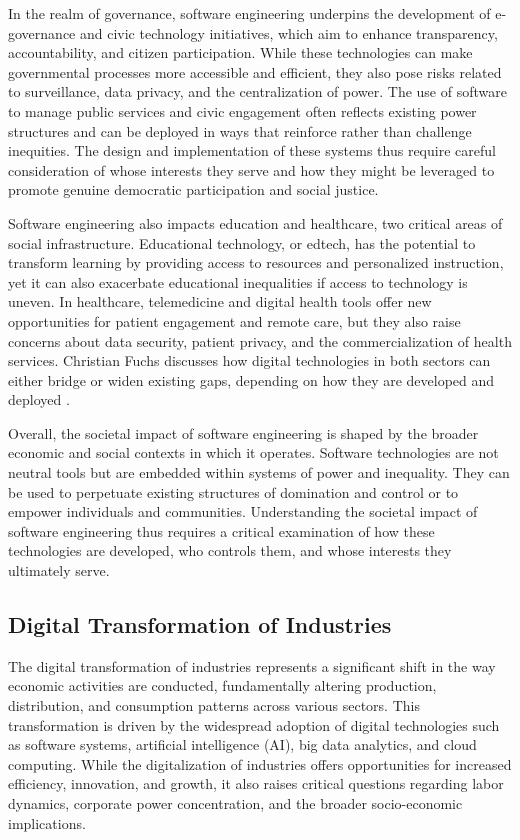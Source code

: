 \begin{refsection}
In the realm of governance, software engineering underpins the development of e-governance and civic technology initiatives, which aim to enhance transparency, accountability, and citizen participation. While these technologies can make governmental processes more accessible and efficient, they also pose risks related to surveillance, data privacy, and the centralization of power. The use of software to manage public services and civic engagement often reflects existing power structures and can be deployed in ways that reinforce rather than challenge inequities. The design and implementation of these systems thus require careful consideration of whose interests they serve and how they might be leveraged to promote genuine democratic participation and social justice.

Software engineering also impacts education and healthcare, two critical areas of social infrastructure. Educational technology, or edtech, has the potential to transform learning by providing access to resources and personalized instruction, yet it can also exacerbate educational inequalities if access to technology is uneven. In healthcare, telemedicine and digital health tools offer new opportunities for patient engagement and remote care, but they also raise concerns about data security, patient privacy, and the commercialization of health services. Christian Fuchs discusses how digital technologies in both sectors can either bridge or widen existing gaps, depending on how they are developed and deployed \cite[pp.~102-105]{fuchs2014digital}.

Overall, the societal impact of software engineering is shaped by the broader economic and social contexts in which it operates. Software technologies are not neutral tools but are embedded within systems of power and inequality. They can be used to perpetuate existing structures of domination and control or to empower individuals and communities. Understanding the societal impact of software engineering thus requires a critical examination of how these technologies are developed, who controls them, and whose interests they ultimately serve.

\subsection{Digital Transformation of Industries}

The digital transformation of industries represents a significant shift in the way economic activities are conducted, fundamentally altering production, distribution, and consumption patterns across various sectors. This transformation is driven by the widespread adoption of digital technologies such as software systems, artificial intelligence (AI), big data analytics, and cloud computing. While the digitalization of industries offers opportunities for increased efficiency, innovation, and growth, it also raises critical questions regarding labor dynamics, corporate power concentration, and the broader socio-economic implications.


\end{refsection}
